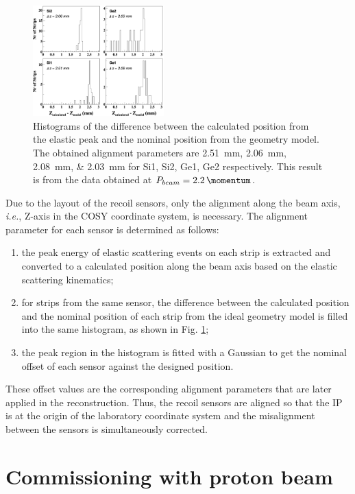 \documentclass[number,5p]{elsarticle}
\begin{document}
\begin{figure}[b!]
  \centering
  \includegraphics[width=0.45\textwidth]{./alignment.png}
  \caption{Histograms of the difference between the calculated position from the
    elastic peak and the nominal position from the geometry model.
    The obtained alignment parameters are
    \SIlist[list-units=single]{2.51;2.06;2.08;2.03}{\mm} for Si1, Si2, Ge1, Ge2 respectively.
    This result is from the data obtained at $P_{beam} =
    \SI{2.2}{\momentum}$.}
  \label{fig:alignment}
\end{figure}
Due to the layout of the recoil sensors, only the alignment along
the beam axis, \textit{i.e.}, Z-axis in the COSY coordinate system, is necessary.
The alignment parameter for each sensor is determined as follows:
\begin{enumerate}
\item the peak energy of elastic scattering events on each strip is extracted and
  converted to a calculated position along the beam axis based on the elastic
  scattering kinematics;
\item for strips from the same sensor, the difference between the calculated
  position and the nominal position of each strip from the ideal geometry model is filled into the same histogram, as shown in Fig. \ref{fig:alignment};
\item the peak region in the histogram is fitted with a Gaussian to get the
  nominal offset of each sensor against the designed position.
\end{enumerate}
These offset values are the corresponding alignment parameters that are later applied in the reconstruction.
Thus, the recoil sensors are aligned so that the IP is at the origin of the
laboratory coordinate system and the misalignment between the sensors is
simultaneously corrected.

\section{Commissioning with proton beam}
\label{sec:result}
\end{document}

